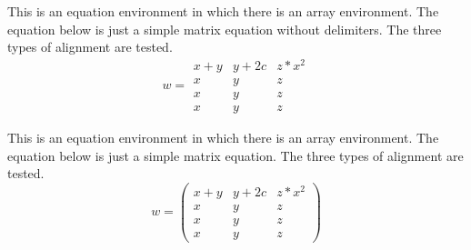 \documentclass{article}
\begin{document}
This is an equation environment in which there is an array environment.  The equation below
is just a simple matrix equation without delimiters.  The three types of alignment are
tested.  
\begin{equation*}
w =  
\begin{array}{lcr}
x+y & y+2c & z * x^2 \\
x & y & z \\
x & y & z \\
x & y & z 
\end{array}
\end{equation*}

This is an equation environment in which there is an array environment.  The equation below
is just a simple matrix equation.  The three types of alignment are
tested.  
\begin{equation}
w = \left( 
\begin{array}{lcr}
x+y & y+2c & z * x^2 \\
x & y & z \\
x & y & z \\
x & y & z 
\end{array}
\right)
\end{equation}
\end{document}
